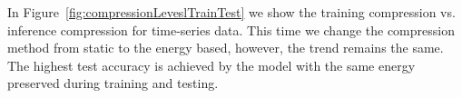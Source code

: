 In Figure~\ref{fig:compressionLeveslTrainTest} we show the training compression vs. inference compression for time-series data. This time we change the compression method from static to the energy based, however, the trend remains the same. The highest test accuracy is achieved by the model with the same energy preserved during training and testing.



